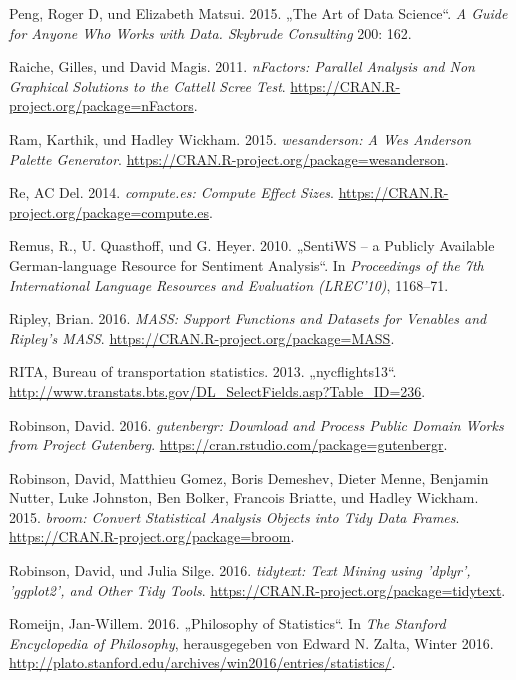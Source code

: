 \documentclass[12pt,ngerman,]{book}
\begin{document}
\hypertarget{ref-peng2015art}{}
Peng, Roger D, und Elizabeth Matsui. 2015. „The Art of Data Science``.
\emph{A Guide for Anyone Who Works with Data. Skybrude Consulting} 200:
162.

\hypertarget{ref-R-nFactors}{}
Raiche, Gilles, und David Magis. 2011. \emph{nFactors: Parallel Analysis
and Non Graphical Solutions to the Cattell Scree Test}.
\url{https://CRAN.R-project.org/package=nFactors}.

\hypertarget{ref-R-wesanderson}{}
Ram, Karthik, und Hadley Wickham. 2015. \emph{wesanderson: A Wes
Anderson Palette Generator}.
\url{https://CRAN.R-project.org/package=wesanderson}.

\hypertarget{ref-R-compute.es}{}
Re, AC Del. 2014. \emph{compute.es: Compute Effect Sizes}.
\url{https://CRAN.R-project.org/package=compute.es}.

\hypertarget{ref-remquahey2010}{}
Remus, R., U. Quasthoff, und G. Heyer. 2010. „SentiWS -- a Publicly
Available German-language Resource for Sentiment Analysis``. In
\emph{Proceedings of the 7th International Language Resources and
Evaluation (LREC'10)}, 1168--71.

\hypertarget{ref-R-MASS}{}
Ripley, Brian. 2016. \emph{MASS: Support Functions and Datasets for
Venables and Ripley's MASS}.
\url{https://CRAN.R-project.org/package=MASS}.

\hypertarget{ref-nycflights13}{}
RITA, Bureau of transportation statistics. 2013. „nycflights13``.
\url{http://www.transtats.bts.gov/DL_SelectFields.asp?Table_ID=236}.

\hypertarget{ref-R-gutenbergr}{}
Robinson, David. 2016. \emph{gutenbergr: Download and Process Public
Domain Works from Project Gutenberg}.
\url{https://cran.rstudio.com/package=gutenbergr}.

\hypertarget{ref-R-broom}{}
Robinson, David, Matthieu Gomez, Boris Demeshev, Dieter Menne, Benjamin
Nutter, Luke Johnston, Ben Bolker, Francois Briatte, und Hadley Wickham.
2015. \emph{broom: Convert Statistical Analysis Objects into Tidy Data
Frames}. \url{https://CRAN.R-project.org/package=broom}.

\hypertarget{ref-R-tidytext}{}
Robinson, David, und Julia Silge. 2016. \emph{tidytext: Text Mining
using 'dplyr', 'ggplot2', and Other Tidy Tools}.
\url{https://CRAN.R-project.org/package=tidytext}.

\hypertarget{ref-sep-statistics}{}
Romeijn, Jan-Willem. 2016. „Philosophy of Statistics``. In \emph{The
Stanford Encyclopedia of Philosophy}, herausgegeben von Edward N. Zalta,
Winter 2016.
\url{http://plato.stanford.edu/archives/win2016/entries/statistics/}.
\end{document}
